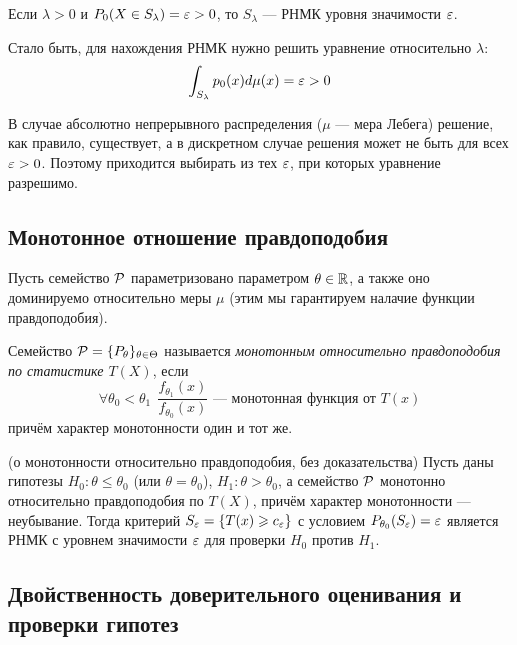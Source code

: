 \begin{corollary}
	Если $\lambda > 0$ и $P_0(X \in S_\lambda) = \varepsilon > 0$, то $S_\lambda$ --- РНМК уровня значимости $\varepsilon$.
\end{corollary}

\begin{note}
	Стало быть, для нахождения РНМК нужно решить уравнение относительно $\lambda$:
	\[
		\int_{S_\lambda} p_0(x)d\mu(x) = \varepsilon > 0
	\]
	
	В случае абсолютно непрерывного распределения ($\mu$ --- мера Лебега) решение, как правило, существует, а в дискретном случае решения может не быть для всех $\varepsilon > 0$. Поэтому приходится выбирать из тех $\varepsilon$, при которых уравнение разрешимо.
\end{note}

\subsection{Монотонное отношение правдоподобия}

\begin{note}
	Пусть семейство $\mathcal{P}$ параметризовано параметром $\theta \in \mathbb{R}$, а также оно доминируемо относительно меры $\mu$ (этим мы гарантируем налачие функции правдоподобия).
\end{note}

\begin{definition}
	Семейство $\mathcal{P} = \{P_\theta\}_{\theta \in \Theta}$ называется \textit{монотонным относительно правдоподобия по статистике $T(X)$}, если
	\[
		\forall \theta_0 < \theta_1\ \ \frac{f_{\theta_1}(x)}{f_{\theta_0}(x)} \text{ --- монотонная функция от $T(x)$}
	\]
	причём характер монотонности один и тот же.
\end{definition}

\begin{theorem} (о монотонности относительно правдоподобия, без доказательства)
	Пусть даны гипотезы $H_0 \colon \theta \le \theta_0$ (или $\theta = \theta_0$), $H_1 \colon \theta > \theta_0$, а семейство $\mathcal{P}$ монотонно относительно правдоподобия по $T(X)$, причём характер монотонности --- неубывание. Тогда критерий $S_{\varepsilon} = \{T(x) \geqslant c_{\varepsilon}\}$ с условием $P_{\theta_0}(S_{\varepsilon}) = \varepsilon$ является РНМК с уровнем значимости $\varepsilon$ для проверки $H_0$ против $H_1$.
\end{theorem}

\subsection{Двойственность доверительного оценивания и проверки гипотез}

